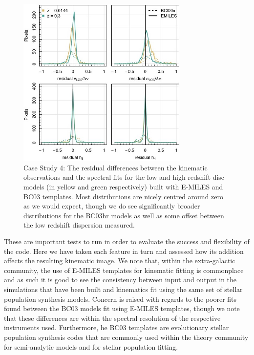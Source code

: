 \documentclass[
  journal=pasa,
  manuscript=research-paper, %
  year=2020,
  volume=37,
]{cup-journal}
\begin{document}
\begin{figure}
    \centering
    \includegraphics[keepaspectratio, width=8.5cm]{cs4_histograms.jpeg}
    \caption{Case Study 4: The residual differences between the kinematic observations and the spectral fits for the low and high redshift disc models (in yellow and green respectively) built with E-MILES and BC03 templates. Most distributions are nicely centred around zero as we would expect, though we do see significantly broader distributions for the BC03hr models as well as some offset between the low redshift dispersion measured.}
    \label{fig:cs4_hist}
\end{figure}

\vspace{0.5cm}

These are important tests to run in order to evaluate the success and flexibility of the code. 
Here we have taken each feature in turn and assessed how its addition affects the resulting kinematic image. 
We note that, within the extra-galactic community, the use of E-MILES templates for kinematic fitting is commonplace and as such it is good to see the consistency between input and output in the simulations that have been built and kinematics fit using the same set of stellar population synthesis models. 
Concern is raised with regards to the poorer fits found between the BC03 models fit using E-MILES templates, though we note that these differences are within the spectral resolution of the respective instruments used. 
Furthermore, he \textsc{BC03} templates are evolutionary stellar population synthesis codes that are commonly used within the theory community for semi-analytic models and for stellar population fitting. 
\end{document}
